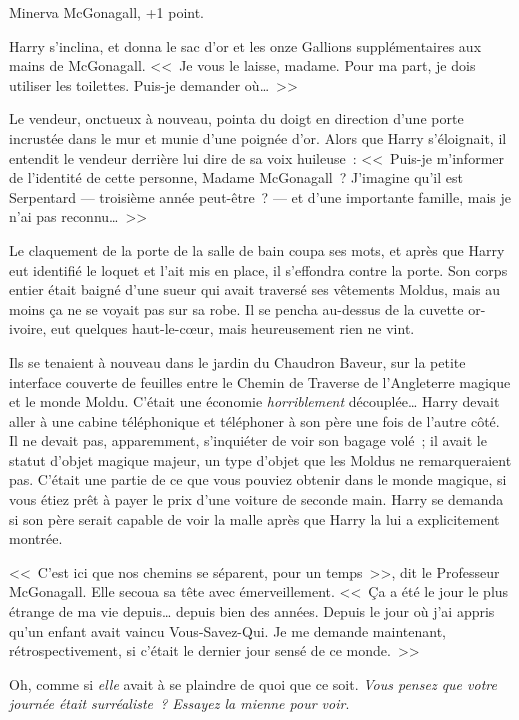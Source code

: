 Minerva McGonagall, +1 point.

Harry s'inclina, et donna le sac d'or et les onze Gallions supplémentaires aux mains de McGonagall. <<~Je vous le laisse, madame. Pour ma part, je dois utiliser les toilettes. Puis-je demander où…~>>

Le vendeur, onctueux à nouveau, pointa du doigt en direction d'une porte incrustée dans le mur et munie d'une poignée d'or. Alors que Harry s'éloignait, il entendit le vendeur derrière lui dire de sa voix huileuse~: <<~Puis-je m'informer de l'identité de cette personne, Madame McGonagall~? J'imagine qu'il est Serpentard — troisième année peut-être~? — et d'une importante famille, mais je n'ai pas reconnu…~>>

Le claquement de la porte de la salle de bain coupa ses mots, et après que Harry eut identifié le loquet et l'ait mis en place, il s'effondra contre la porte. Son corps entier était baigné d'une sueur qui avait traversé ses vêtements Moldus, mais au moins ça ne se voyait pas sur sa robe. Il se pencha au-dessus de la cuvette or-ivoire, eut quelques haut-le-cœur, mais heureusement rien ne vint.

\later

Ils se tenaient à nouveau dans le jardin du Chaudron Baveur, sur la petite interface couverte de feuilles entre le Chemin de Traverse de l'Angleterre magique et le monde Moldu. C'était une économie \emph{horriblement} découplée… Harry devait aller à une cabine téléphonique et téléphoner à son père une fois de l'autre côté. Il ne devait pas, apparemment, s'inquiéter de voir son bagage volé~; il avait le statut d'objet magique majeur, un type d'objet que les Moldus ne remarqueraient pas. C'était une partie de ce que vous pouviez obtenir dans le monde magique, si vous étiez prêt à payer le prix d'une voiture de seconde main. Harry se demanda si son père serait capable de voir la malle après que Harry la lui a explicitement montrée.

<<~C'est ici que nos chemins se séparent, pour un temps~>>, dit le Professeur McGonagall. Elle secoua sa tête avec émerveillement. <<~Ça a été le jour le plus étrange de ma vie depuis… depuis bien des années. Depuis le jour où j'ai appris qu'un enfant avait vaincu Vous-Savez-Qui. Je me demande maintenant, rétrospectivement, si c'était le dernier jour sensé de ce monde.~>>

Oh, comme si \emph{elle} avait à se plaindre de quoi que ce soit. \emph{Vous pensez que votre journée était surréaliste~? Essayez la mienne pour voir}.

